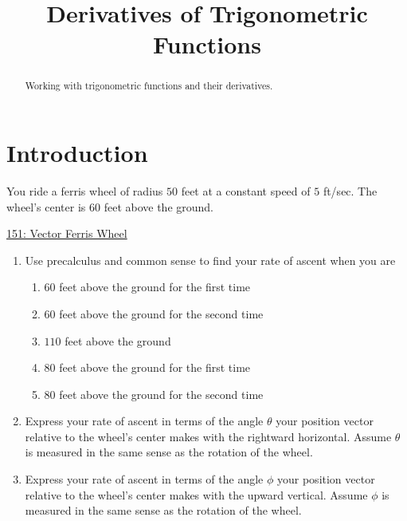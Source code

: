 \documentclass{ximera}
\title{Derivatives of Trigonometric Functions}
\begin{document}
\begin{abstract}
Working with trigonometric functions and their derivatives.
\end{abstract}
\maketitle



\section{Introduction}

\begin{question}  \label{QodfdfisOO}
You ride a ferris wheel of radius $50$ feet at a constant speed of $5$ ft/sec. The wheel's center is $60$ feet above the ground.


\begin{onlineOnly}
    \begin{center}
\end{center}
\end{onlineOnly}

\href{https://www.desmos.com/calculator/yvsapeyysi}{151: Vector Ferris Wheel}

\begin{enumerate}
\item Use precalculus and common sense to find your rate of ascent when you are 

\begin{enumerate}
\item $60$ feet above the ground for the first time

\item $60$ feet above the ground for the second time

\item $110$ feet above the ground

\item $80$ feet above the ground for the first time

\item $80$ feet above the ground for the second time

\end{enumerate}

\item Express your rate of ascent in terms of the angle $\theta$ your position vector relative to the wheel's center makes with the rightward horizontal. Assume $\theta$ is measured in the same sense as the rotation of the wheel.

\item Express your rate of ascent in terms of the angle $\phi$ your position vector relative to the wheel's center makes with the upward vertical. Assume  $\phi$ is measured in the same sense as the rotation of the wheel.


\end{enumerate}




\end{question}
\end{document}
